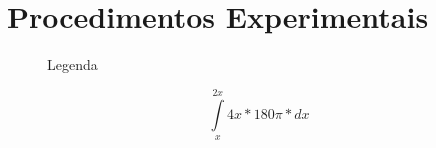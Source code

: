 \section{Procedimentos Experimentais}
\lipsum[1]
\begin{figure}[h]
	\caption{Legenda}
	\label{fig:placeholder.jpg}
\end{figure}
\begin{center}
	\begin{equation}
	\int\limits_{x}^{2x} 4x*180\pi*dx
	\end{equation}
\end{center}